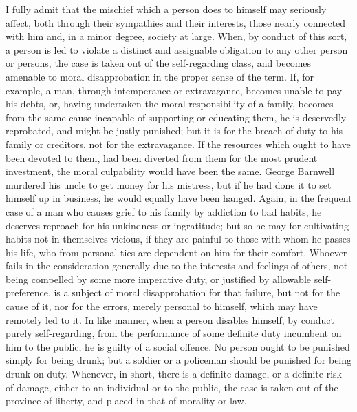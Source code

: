 \documentclass[11pt,openany]{book}
\begin{document}
I fully admit that the mischief which a person does to himself may seriously affect, both through their sympathies and their interests, those nearly connected with him and, in a minor degree, society at large. When, by conduct of this sort, a person is led to violate a distinct and assignable obligation to any other person or persons, the case is taken out of the self-regarding class, and becomes amenable to moral disapprobation in the proper sense of the term. If, for example, a man, through intemperance or extravagance, becomes unable to pay his debts, or, having undertaken the moral responsibility of a family, becomes from the same cause incapable of supporting or educating them, he is deservedly reprobated, and might be justly punished; but it is for the breach of duty to his family or creditors, not for the extravagance. If the resources which ought to have been devoted to them, had been diverted from them for the most prudent investment, the moral culpability would have been the same. George Barnwell murdered his uncle to get money for his mistress, but if he had done it to set himself up in business, he would equally have been hanged. Again, in the frequent case of a man who causes grief to his family by addiction to bad habits, he deserves reproach for his unkindness or ingratitude; but so he may for cultivating habits not in themselves vicious, if they are painful to those with whom he passes his life, who from personal ties are dependent on him for their comfort. Whoever fails in the consideration generally due to the interests and feelings of others, not being compelled by some more imperative duty, or justified by allowable self-preference, is a subject of moral disapprobation for that failure, but not for the cause of it, nor for the errors, merely personal to himself, which may have remotely led to it. In like manner, when a person disables himself, by conduct purely self-regarding, from the performance of some definite duty incumbent on him to the public, he is guilty of a social offence. No person ought to be punished simply for being drunk; but a soldier or a policeman should be punished for being drunk on duty. Whenever, in short, there is a definite damage, or a definite risk of damage, either to an individual or to the public, the case is taken out of the province of liberty, and placed in that of morality or law.
\end{document}
